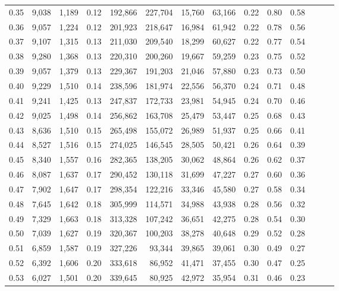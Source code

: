 \begin{tabular}{rrrrrrrrrrrrrr}
0.35 &  9,038 &  1,189 &  0.12 &  192,866 &  227,704 &  15,760 &  63,166 &  0.22 &  0.80 &      0.58 \\
0.36 &  9,057 &  1,224 &  0.12 &  201,923 &  218,647 &  16,984 &  61,942 &  0.22 &  0.78 &      0.56 \\
0.37 &  9,107 &  1,315 &  0.13 &  211,030 &  209,540 &  18,299 &  60,627 &  0.22 &  0.77 &      0.54 \\
0.38 &  9,280 &  1,368 &  0.13 &  220,310 &  200,260 &  19,667 &  59,259 &  0.23 &  0.75 &      0.52 \\
0.39 &  9,057 &  1,379 &  0.13 &  229,367 &  191,203 &  21,046 &  57,880 &  0.23 &  0.73 &      0.50 \\
0.40 &  9,229 &  1,510 &  0.14 &  238,596 &  181,974 &  22,556 &  56,370 &  0.24 &  0.71 &      0.48 \\
0.41 &  9,241 &  1,425 &  0.13 &  247,837 &  172,733 &  23,981 &  54,945 &  0.24 &  0.70 &      0.46 \\
0.42 &  9,025 &  1,498 &  0.14 &  256,862 &  163,708 &  25,479 &  53,447 &  0.25 &  0.68 &      0.43 \\
0.43 &  8,636 &  1,510 &  0.15 &  265,498 &  155,072 &  26,989 &  51,937 &  0.25 &  0.66 &      0.41 \\
0.44 &  8,527 &  1,516 &  0.15 &  274,025 &  146,545 &  28,505 &  50,421 &  0.26 &  0.64 &      0.39 \\
0.45 &  8,340 &  1,557 &  0.16 &  282,365 &  138,205 &  30,062 &  48,864 &  0.26 &  0.62 &      0.37 \\
0.46 &  8,087 &  1,637 &  0.17 &  290,452 &  130,118 &  31,699 &  47,227 &  0.27 &  0.60 &      0.36 \\
0.47 &  7,902 &  1,647 &  0.17 &  298,354 &  122,216 &  33,346 &  45,580 &  0.27 &  0.58 &      0.34 \\
0.48 &  7,645 &  1,642 &  0.18 &  305,999 &  114,571 &  34,988 &  43,938 &  0.28 &  0.56 &      0.32 \\
0.49 &  7,329 &  1,663 &  0.18 &  313,328 &  107,242 &  36,651 &  42,275 &  0.28 &  0.54 &      0.30 \\
0.50 &  7,039 &  1,627 &  0.19 &  320,367 &  100,203 &  38,278 &  40,648 &  0.29 &  0.52 &      0.28 \\
0.51 &  6,859 &  1,587 &  0.19 &  327,226 &   93,344 &  39,865 &  39,061 &  0.30 &  0.49 &      0.27 \\
0.52 &  6,392 &  1,606 &  0.20 &  333,618 &   86,952 &  41,471 &  37,455 &  0.30 &  0.47 &      0.25 \\
0.53 &  6,027 &  1,501 &  0.20 &  339,645 &   80,925 &  42,972 &  35,954 &  0.31 &  0.46 &      0.23 \\

\end{tabular}
